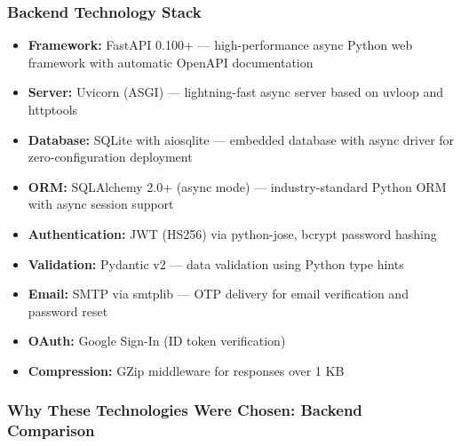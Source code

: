\documentclass[12pt]{article}
\begin{document}
	\subsubsection{Backend Technology Stack}

	\begin{itemize}
		\item \textbf{Framework:} FastAPI 0.100+ --- high-performance async Python web framework with automatic OpenAPI documentation
		\item \textbf{Server:} Uvicorn (ASGI) --- lightning-fast async server based on uvloop and httptools
		\item \textbf{Database:} SQLite with aiosqlite --- embedded database with async driver for zero-configuration deployment
		\item \textbf{ORM:} SQLAlchemy 2.0+ (async mode) --- industry-standard Python ORM with async session support
		\item \textbf{Authentication:} JWT (HS256) via python-jose, bcrypt password hashing
		\item \textbf{Validation:} Pydantic v2 --- data validation using Python type hints
		\item \textbf{Email:} SMTP via smtplib --- OTP delivery for email verification and password reset
		\item \textbf{OAuth:} Google Sign-In (ID token verification)
		\item \textbf{Compression:} GZip middleware for responses over 1 KB
	\end{itemize}

	\subsubsection{Why These Technologies Were Chosen: Backend Comparison}
\end{document}
